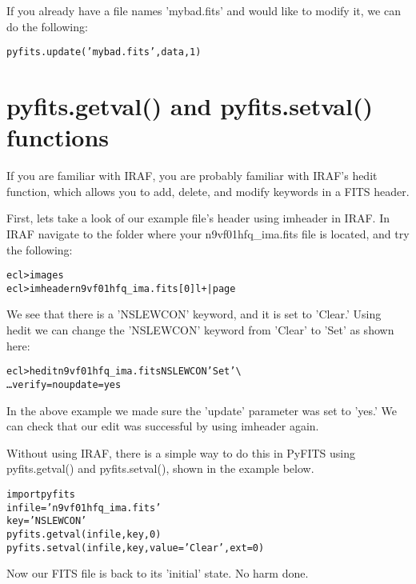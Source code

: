 If you already have a file names 'mybad.fits' and would like to
modify it, we can do the following:

\texttt{\pytab pyfits.update('mybad.fits',data,1)}

\section{{\sf pyfits.getval()} and {\sf pyfits.setval()} functions}

If you are familiar with IRAF, you are probably familiar with IRAF's
{\sf\small hedit} function, which allows you to add, delete, and
modify keywords in a FITS header.  

First, lets take a look of our example file's header using {\sf\small
  imheader} in IRAF.  In IRAF navigate to the folder where your
n9vf01hfq\_ima.fits file is located, and try the following:

\begin{alltt}
ecl> images
ecl> imheader n9vf01hfq_ima.fits[0] l+ | page 
\end{alltt}

We see that there is a 'NSLEWCON' keyword, and it is set to 'Clear.'
Using {\sf\small hedit} we can change the 'NSLEWCON' keyword from
'Clear' to 'Set' as shown here:

\begin{alltt}
ecl> hedit n9vf01hfq_ima.fits NSLEWCON 'Set'  \textbackslash
\ldots     verify=no update=yes
\end{alltt}

In the above example we made sure the 'update' parameter was set to
'yes.'  We can check that our edit was successful by using  {\sf\small
  imheader} again.  

Without using IRAF, there is a simple way to do this in PyFITS using
{\sf\small pyfits.getval()} and {\sf\small pyfits.setval()}, shown in
the example below.

\begin{alltt}
\pytab import pyfits 
\pytab infile = 'n9vf01hfq_ima.fits' 
\pytab key = 'NSLEWCON'
\pytab pyfits.getval(infile,key, 0)
\pytab pyfits.setval(infile,key,value='Clear', ext=0)
\end{alltt}

Now our FITS file is back to its 'initial' state.  No harm done.
    
